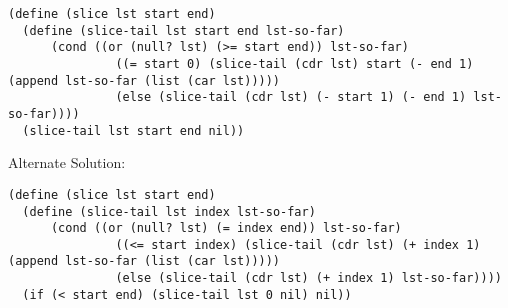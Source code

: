 \begin{blocksection}
\begin{solution}
\begin{lstlisting}
(define (slice lst start end)
  (define (slice-tail lst start end lst-so-far)
      (cond ((or (null? lst) (>= start end)) lst-so-far)
               ((= start 0) (slice-tail (cdr lst) start (- end 1) (append lst-so-far (list (car lst)))))
               (else (slice-tail (cdr lst) (- start 1) (- end 1) lst-so-far))))
  (slice-tail lst start end nil))
\end{lstlisting}
Alternate Solution:
\begin{lstlisting}
(define (slice lst start end)
  (define (slice-tail lst index lst-so-far)
      (cond ((or (null? lst) (= index end)) lst-so-far)
               ((<= start index) (slice-tail (cdr lst) (+ index 1) (append lst-so-far (list (car lst)))))
               (else (slice-tail (cdr lst) (+ index 1) lst-so-far))))
  (if (< start end) (slice-tail lst 0 nil) nil))
\end{lstlisting}
\end{solution}

\end{blocksection}
